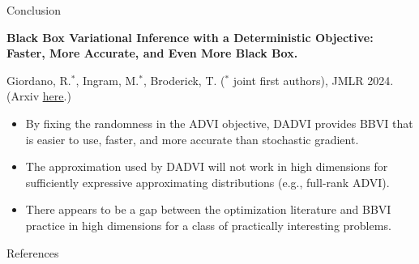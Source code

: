\documentclass[8pt]{beamer}\usepackage[]{graphicx}\usepackage[]{color}
\begin{document}


\begin{frame}{Conclusion}


\textbf{Black Box Variational Inference with a Deterministic
Objective: Faster, More Accurate, and Even More Black Box.}

Giordano, R.$^*$, Ingram, M.$^*$, Broderick, T.
($^*$ joint first authors), JMLR 2024.
(Arxiv \href{https://arxiv.org/pdf/2304.05527.pdf}{\underline{here}}.)

\vspace{2em}
%
\begin{itemize}
    \item By fixing the randomness in the ADVI objective, DADVI provides 
        BBVI that is easier to use, faster, and more accurate than stochastic gradient.
    \item The approximation used by DADVI will not work in high dimensions
        for sufficiently expressive approximating distributions (e.g., 
        full-rank ADVI).
    \item There appears to be a gap between the optimization literature and 
        BBVI practice in high dimensions for a class of practically interesting
        problems.
\end{itemize}
%



\end{frame}



\begin{frame}{References}

    \footnotesize
    
    
    \begingroup
    \renewcommand{\section}[2]{}%
    
    \endgroup
    
\end{frame}
    
\end{document}
